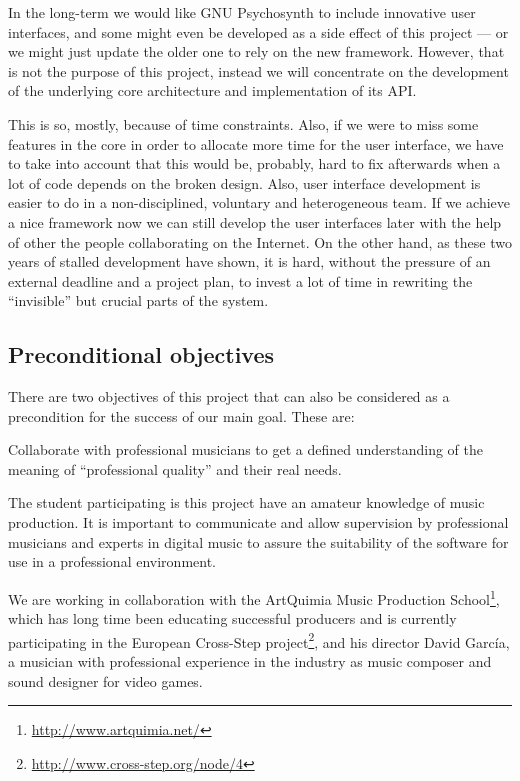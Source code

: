 In the long-term we would like GNU Psychosynth to include innovative
user interfaces, and some might even be developed as a side effect of
this project --- or we might just update the older one to rely on the
new framework. However, that is not the purpose of this project,
instead we will concentrate on the development of the underlying core
architecture and implementation of its API.

This is so, mostly, because of time constraints. Also, if we were to
miss some features in the core in order to allocate more time for the
user interface, we have to take into account that this would be,
probably, hard to fix afterwards when a lot of code depends on the
broken design. Also, user interface development is easier to do in a
non-disciplined, voluntary and heterogeneous team. If we achieve a
nice framework now we can still develop the user interfaces later with
the help of other the people collaborating on the Internet. On the
other hand, as these two years of stalled development have shown, it
is hard, without the pressure of an external deadline and a project
plan, to invest a lot of time in rewriting the ``invisible'' but
crucial parts of the system.

\subsection{Preconditional objectives}

There are two objectives of this project that can also be considered
as a precondition for the success of our main goal. These are:

\begin{objective} \label{obj:artquimia}
Collaborate with professional musicians to get a
defined understanding of the meaning of ``professional quality'' and
their real needs.
\end{objective}

The student participating is this project have an amateur knowledge of
music production. It is important to communicate and allow supervision
by professional musicians and experts in digital music to assure the
suitability of the software for use in a professional environment.

We are working in collaboration with the ArtQuimia
Music Production School\footnote{\url{http://www.artquimia.net/}},
which has long time been educating successful producers and is
currently participating in the European Cross-Step
project\footnote{\url{http://www.cross-step.org/node/4}}, and his
director David García, a musician with professional experience in the
industry as music composer and sound designer for video games.

